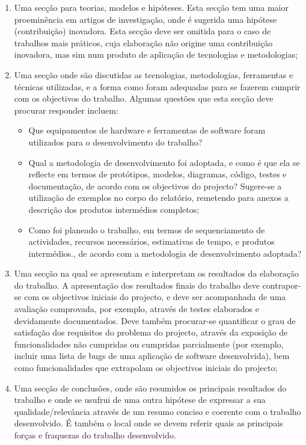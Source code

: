 \begin{enumerate}
 \item Uma secção para teorias, modelos e hipóteses. Esta secção tem uma maior proeminência em artigos de investigação, onde é sugerida uma hipótese (contribuição) inovadora. Esta secção deve ser omitida para o caso de trabalhos mais práticos, cuja elaboração não origine uma contribuição inovadora, mas sim num produto de aplicação de tecnologias e metodologias;
 \item Uma secção onde são discutidas as tecnologias, metodologias, ferramentas e técnicas utilizadas, e a forma como foram adequadas para se fazerem cumprir com os objectivos do trabalho. Algumas questões que esta secção deve procurar responder incluem:
 \begin{itemize}
  \item Que equipamentos de hardware e ferramentas de software foram utilizados para o desenvolvimento do trabalho?
  \item Qual a metodologia de desenvolvimento foi adoptada, e como é que ela se reflecte em termos de protótipos, modelos, diagramas, código, testes e documentação, de acordo com os objectivos do projecto? Sugere-se a utilização de exemplos no corpo do relatório, remetendo para anexos a descrição dos produtos intermédios completos;
  \item Como foi planeado o trabalho, em termos de sequenciamento de actividades, recursos necessários, estimativas de tempo, e produtos intermédios., de acordo com a metodologia de desenvolvimento adoptada?
 \end{itemize}
 \item Uma secção na qual se apresentam e interpretam os resultados da elaboração do trabalho. A apresentação dos resultados finais do trabalho deve contrapor-se com os objectivos iniciais do projecto, e deve ser acompanhada de uma avaliação comprovada, por exemplo, através de testes elaborados e devidamente documentados. Deve também procurar-se quantificar o grau de satisfação dos requisitos do problema do projecto, através da exposição de funcionalidades não cumpridas ou cumpridas parcialmente (por exemplo, incluir uma lista de bugs de uma aplicação de software desenvolvida), bem como funcionalidades que extrapolam os objectivos iniciais do projecto;
 \item Uma secção de conclusões, onde são resumidos os principais resultados do trabalho e onde se usufrui de uma outra hipótese de expressar a sua qualidade/relevância através de um resumo conciso e coerente com o trabalho desenvolvido. É também o local onde se devem referir quais as principais forças e fraquezas do trabalho desenvolvido.

\end{enumerate}
